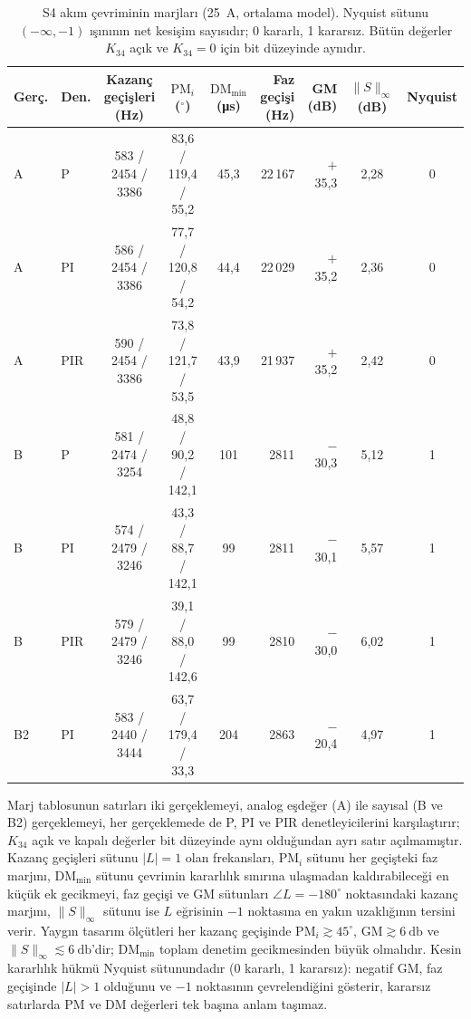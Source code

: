 \begin{table}[htbp]
  \centering
  \caption{S4 akım çevriminin marjları (\SI{25}{\ampere}, ortalama model). Nyquist sütunu $(-\infty,-1)$ ışınının net kesişim sayısıdır; 0 kararlı, 1 kararsız. Bütün değerler $K_{34}$ açık ve $K_{34}=0$ için bit düzeyinde aynıdır.}
  \label{tab:kararlilik-marjlar}
  \scriptsize
  \setlength{\tabcolsep}{2.8pt}
  \begin{tabular}{@{}l l c c c r r c c@{}}
    \toprule
    Gerç. & Den. & Kazanç geçişleri (Hz) & $\mathrm{PM}_i$ ($^{\circ}$) & $\mathrm{DM}_{\min}$ (\si{\micro\second}) & Faz geçişi (Hz) & GM (dB) & $\|S\|_\infty$ (dB) & Nyquist \\
    \midrule
    A  & P   & 583 / 2454 / 3386 & 83,6 / 119,4 / 55,2 & 45,3 & 22\,167 & $+$35,3 & 2,28 & 0 \\
    A  & PI  & 586 / 2454 / 3386 & 77,7 / 120,8 / 54,2 & 44,4 & 22\,029 & $+$35,2 & 2,36 & 0 \\
    A  & PIR & 590 / 2454 / 3386 & 73,8 / 121,7 / 53,5 & 43,9 & 21\,937 & $+$35,2 & 2,42 & 0 \\
    \midrule
    B  & P   & 581 / 2474 / 3254 & 48,8 / 90,2 / 142,1 & 101 & 2811 & $-$30,3 & 5,12 & 1 \\
    B  & PI  & 574 / 2479 / 3246 & 43,3 / 88,7 / 142,1 & 99  & 2811 & $-$30,1 & 5,57 & 1 \\
    B  & PIR & 579 / 2479 / 3246 & 39,1 / 88,0 / 142,6 & 99  & 2810 & $-$30,0 & 6,02 & 1 \\
    B2 & PI  & 583 / 2440 / 3444 & 63,7 / 179,4 / 33,3 & 204 & 2863 & $-$20,4 & 4,97 & 1 \\
    \bottomrule
  \end{tabular}
\end{table}

Marj tablosunun satırları iki gerçeklemeyi, analog eşdeğer (A) ile sayısal (B ve B2) gerçeklemeyi, her gerçeklemede de P, PI ve PIR denetleyicilerini karşılaştırır; $K_{34}$ açık ve kapalı değerler bit düzeyinde aynı olduğundan ayrı satır açılmamıştır. Kazanç geçişleri sütunu $|L|=1$ olan frekansları, $\mathrm{PM}_i$ sütunu her geçişteki faz marjını, $\mathrm{DM}_{\min}$ sütunu çevrimin kararlılık sınırına ulaşmadan kaldırabileceği en küçük ek gecikmeyi, faz geçişi ve GM sütunları $\angle L=-180^{\circ}$ noktasındaki kazanç marjını, $\|S\|_\infty$ sütunu ise $L$ eğrisinin $-1$ noktasına en yakın uzaklığının tersini verir. Yaygın tasarım ölçütleri her kazanç geçişinde $\mathrm{PM}_i\gtrsim45^{\circ}$, $\mathrm{GM}\gtrsim\SI{6}{\decibel}$ ve $\|S\|_\infty\lesssim\SI{6}{\decibel}$'dir; $\mathrm{DM}_{\min}$ toplam denetim gecikmesinden büyük olmalıdır. Kesin kararlılık hükmü Nyquist sütunundadır (0 kararlı, 1 kararsız): negatif GM, faz geçişinde $|L|>1$ olduğunu ve $-1$ noktasının çevrelendiğini gösterir, kararsız satırlarda PM ve DM değerleri tek başına anlam taşımaz.

